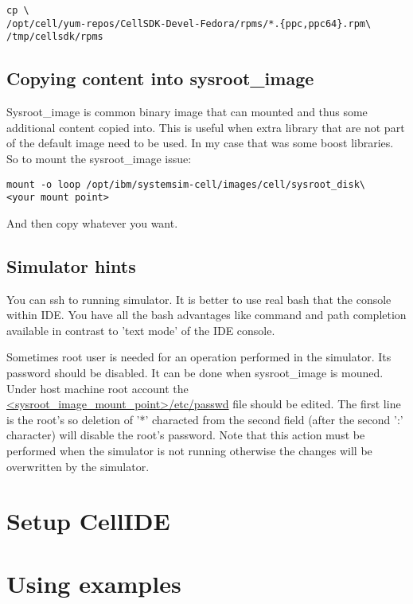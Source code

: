 \begin{verbatim}
cp \
/opt/cell/yum-repos/CellSDK-Devel-Fedora/rpms/*.{ppc,ppc64}.rpm\
/tmp/cellsdk/rpms
\end{verbatim}

\subsection{Copying content into sysroot\_image}

Sysroot\_image is common binary image that can mounted and thus some additional content copied into.
This is useful when extra library that are not part of the default image need to be used.
In my case that was some boost libraries. So to mount the sysroot\_image issue:
\begin{verbatim}
mount -o loop /opt/ibm/systemsim-cell/images/cell/sysroot_disk\
<your mount point>
\end{verbatim}
And then copy whatever you want.

\subsection{Simulator hints}

\par
You can ssh to running simulator. It is better to use real bash that the console within IDE.
You have all the bash advantages like command and path completion available in contrast to 'text mode' of the IDE console.

\par
Sometimes root user is needed for an operation performed in the simulator.
Its password should be disabled.
It can be done when sysroot\_image is mouned.
Under host machine root account the \url{<sysroot_image_mount_point>/etc/passwd} file should be edited.
The first line is the root's so deletion of '*' characted from the second field (after the second ':' character) will disable the root's password.
Note that this action must be performed when the simulator is not running otherwise the changes will be overwritten by the simulator.

\section{Setup CellIDE}

\section{Using examples}

